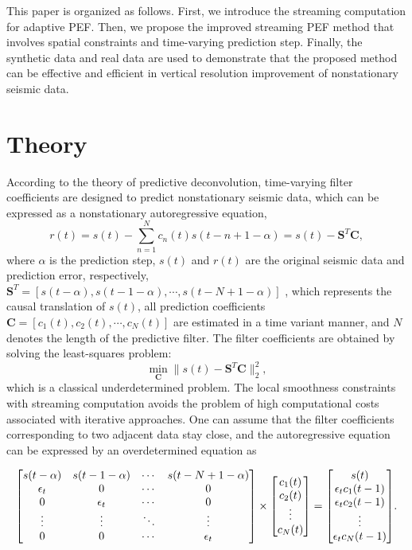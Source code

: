 This paper is organized as follows. First, we introduce the streaming
computation for adaptive PEF. Then, we propose the improved streaming
PEF method that involves spatial constraints and time-varying
prediction step.  Finally, the synthetic data and real data are used
to demonstrate that the proposed method can be effective and efficient
in vertical resolution improvement of nonstationary seismic data.

\section{Theory}
According to the theory of predictive deconvolution, time-varying filter
coefficients are designed to predict nonstationary seismic data, which can
be expressed as a nonstationary autoregressive equation,
\begin{equation}
  \label{eq:1}
  r(t)=s(t)-\sum_{n=1}^N c_n(t)s(t-n+1-\alpha)=s(t)-\mathbf{S}^T\mathbf{C},
\end{equation}
where $\alpha$ is the prediction step, $s(t)$ and $r(t)$ are the original
seismic data and prediction error, respectively,
$\mathbf{S}^T=[s(t-\alpha),s(t-1-\alpha),\cdots,s(t-N+1-\alpha)]$ ,
which represents the causal translation of $s(t)$, all prediction
coefficients $\mathbf{C}=[c_1(t),c_2(t),\cdots,c_N(t)]$
are estimated in a time variant manner, and $N$ denotes the length of
the predictive filter. The filter coefficients are obtained by solving
the least-squares problem:
\begin{equation}
  \label{eq:2}
  \min_{\mathbf{C}}\parallel{s(t)-\mathbf{S}^T\mathbf{C}}\parallel_2^2,
\end{equation}
which is a classical underdetermined problem. The local smoothness
constraints with streaming computation \cite[]{Fomel16}
avoids the problem of high computational costs associated with iterative
approaches. One can assume that the filter coefficients corresponding to
two adjacent data stay close, and the autoregressive equation can be
expressed by an overdetermined equation as

\begin{equation}
\begin{aligned}
  \label{eq:3}
  \begin{bmatrix}
   s(t-\alpha) & s(t-1-\alpha) & \cdots & s(t-N+1-\alpha) \cr
    \epsilon_t  & 0             & \cdots & 0 \cr
    0           & \epsilon_t    & \cdots & 0 \cr
    \vdots      & \vdots        & \ddots & \vdots \cr
    0           & 0             & \cdots & \epsilon_t
  \end{bmatrix}
  \times
  \begin{bmatrix}
  c_1(t) \cr c_2(t) \cr  \vdots \cr c_N(t)
  \end{bmatrix}
  =
 \begin{bmatrix}
 s(t) \cr \epsilon_tc_1(t-1) \cr \epsilon_tc_2(t-1) \cr \vdots \cr
 \epsilon_tc_N(t-1)
 \end{bmatrix} 
\end{aligned}.
\end{equation}

